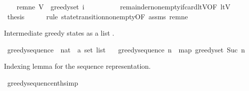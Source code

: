 \begin{isabellebody}
\isanewline
\isanewline
\ \ \isamarkupfalse%
\ rem{\isacharunderscore}{\kern0pt}ne{\isacharcolon}{\kern0pt}\ {\isachardoublequoteopen}V\ {\isacharminus}{\kern0pt}\ greedy{\isacharunderscore}{\kern0pt}set\ {\isacharparenleft}{\kern0pt}i\ {\isacharminus}{\kern0pt}\ {}{\isacharparenright}{\kern0pt}\ {\isasymnoteq}\ {\isacharbraceleft}{\kern0pt}{\isacharbraceright}{\kern0pt}{\isachardoublequoteclose}\isanewline
\ \ \ \ \isamarkupfalse%
\ remainder{\isacharunderscore}{\kern0pt}nonempty{\isacharunderscore}{\kern0pt}if{\isacharunderscore}{\kern0pt}card{\isacharunderscore}{\kern0pt}ltV{\isacharbrackleft}{\kern0pt}OF\ ltV{\isacharbrackright}{\kern0pt}\ \isakeywordONE{{\isachardot}{\kern0pt}}\isamarkupfalse%
\isanewline
\isanewline
\ \ \isamarkupfalse%
\ {\isacharquery}{\kern0pt}thesis\isanewline
\ \ \ \ \isamarkupfalse%
\ {\isacharparenleft}{\kern0pt}rule\ state{\isacharunderscore}{\kern0pt}transition{\isacharunderscore}{\kern0pt}nonempty{\isacharbrackleft}{\kern0pt}OF\ assms{\isacharparenleft}{\kern0pt}{}{\isacharparenright}{\kern0pt}\ rem{\isacharunderscore}{\kern0pt}ne{\isacharbrackright}{\kern0pt}{\isacharparenright}{\kern0pt}\isanewline
{}\isamarkupfalse%
%
\endisatagproof
{\isafoldproof}%
%
\isadelimproof
%
\endisadelimproof
%
\begin{isamarkuptext}%
Intermediate greedy states as a list .%
\end{isamarkuptext}\isamarkuptrue%
\isamarkupfalse%
\ greedy{\isacharunderscore}{\kern0pt}sequence\ {\isacharcolon}{\kern0pt}{\isacharcolon}{\kern0pt}\ {\isachardoublequoteopen}nat\ {\isasymRightarrow}\ {\isacharprime}{\kern0pt}a\ set\ list{\isachardoublequoteclose}\ \isanewline
\ \ {\isachardoublequoteopen}greedy{\isacharunderscore}{\kern0pt}sequence\ n\ {\isacharequal}{\kern0pt}\ map\ greedy{\isacharunderscore}{\kern0pt}set\ {\isacharbrackleft}{\kern0pt}{}{\isachardot}{\kern0pt}{\isachardot}{\kern0pt}{\isacharless}{\kern0pt}Suc\ n{\isacharbrackright}{\kern0pt}{\isachardoublequoteclose}%
\begin{isamarkuptext}%
Indexing lemma for the sequence representation.%
\end{isamarkuptext}\isamarkuptrue%
\isamarkupfalse%
\ greedy{\isacharunderscore}{\kern0pt}sequence{\isacharunderscore}{\kern0pt}nth{\isacharbrackleft}{\kern0pt}simp{\isacharbrackright}{\kern0pt}{\isacharcolon}{\kern0pt}\isanewline

\end{isabellebody}

